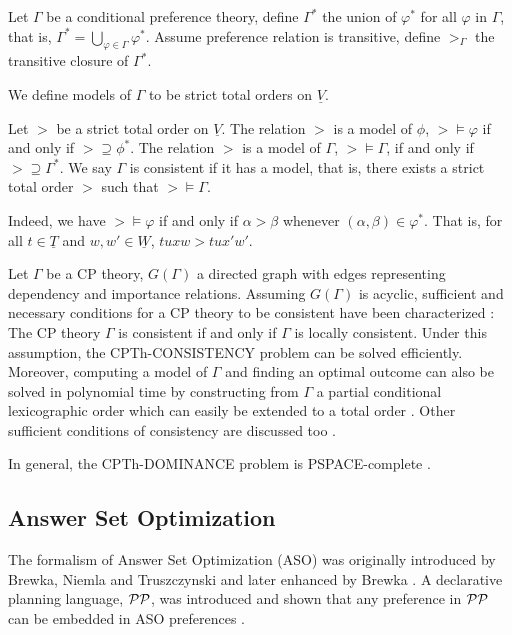 \begin{definition}
	Let $\Gamma$ be a conditional preference theory, define $\Gamma^*$
	the union of $\varphi^*$ for all $\varphi$ in $\Gamma$, that is,
	$\Gamma^* = \bigcup_{\varphi \in \Gamma} \varphi^*$.
	Assume preference relation is transitive, define $>_{\Gamma}$
	the transitive closure of $\Gamma^*$.
\end{definition}

We define models of $\Gamma$ to be strict total orders on $\underline{V}$.
\begin{definition}
	Let $>$ be a strict total order on $\underline{V}$.
	The relation $>$ is a model of $\phi$, $> \models \varphi$ if and only if
	$> \supseteq \phi^*$.  
	The relation $>$ is a model of $\Gamma$, $> \models \Gamma$, if and only if 
	$> \supseteq \Gamma^*$.
	We say $\Gamma$ is consistent if it has a model, that is, 
	there exists a strict total order $>$
	such that $> \models \Gamma$.
\end{definition}

Indeed, we have $> \models \varphi$ if and only if $\alpha > \beta$ whenever
$(\alpha,\beta) \in \varphi^*$.  That is, for all $t \in \underline{T}$ and
$w,w' \in \underline{W}$, $tuxw > tux'w'$.


Let $\Gamma$ be a CP theory, $G(\Gamma)$ a directed graph with edges
representing dependency and importance relations.
Assuming $G(\Gamma)$ is acyclic,
sufficient and necessary conditions for a CP theory to be consistent
have been characterized \cite{Wilson04extendingcp-nets}:
The CP theory $\Gamma$ is consistent if and only if
$\Gamma$ is locally consistent.
Under this assumption, the CPTh-CONSISTENCY problem can be solved
efficiently.  Moreover, computing a model of $\Gamma$ and 
finding an optimal outcome can also be solved in polynomial time
by constructing from $\Gamma$ a partial conditional lexicographic order
which can easily be extended to a total order
\cite{Wilson04extendingcp-nets}.
Other sufficient conditions of consistency are discussed too
\cite{WilsonECAI04}.

In general, the CPTh-DOMINANCE problem is PSPACE-complete
\cite{Wilson:2006:EUA:1567016.1567119}.


\subsection{Answer Set Optimization}
The formalism of Answer Set Optimization (ASO) was originally introduced by
Brewka, Niemla and Truszczynski \cite{Brewka03answerset} and
later enhanced by Brewka \cite{Brewka04}.
A declarative planning language, $\mathcal{PP}$, was introduced \cite{Son:plan_pref}
and shown that any preference in $\mathcal{PP}$ can be embedded in ASO preferences
\cite{Brewka04}.

